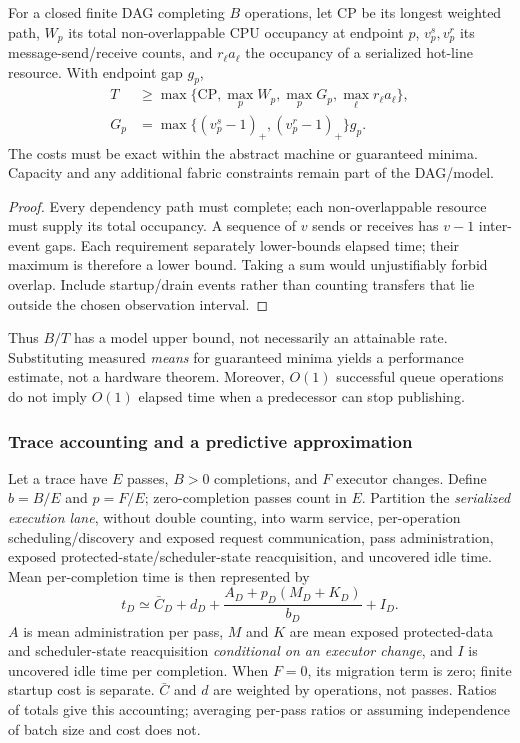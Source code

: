\begin{proposition}
\label{prop:resource}
For a closed finite DAG completing $B$ operations, let $\mathrm{CP}$ be its
longest weighted path, $W_p$ its total non-overlappable CPU occupancy at
endpoint $p$, $v_p^s,v_p^r$ its message-send/receive counts, and $r_\ell a_\ell$
the occupancy of a serialized hot-line resource. With endpoint gap $g_p$,
\begin{align}
T &\ge \max\{\mathrm{CP},\max_p W_p,\max_p G_p,
                    \max_\ell r_\ell a_\ell\},\label{eq:resource}\\
G_p&=\max\{(v_p^s-1)_+,(v_p^r-1)_+\}g_p .\nonumber
\end{align}
The costs must be exact within the abstract machine or guaranteed minima.
Capacity and any additional fabric constraints remain part of the DAG/model.
\end{proposition}
\begin{proof}
Every dependency path must complete; each non-overlappable resource must
supply its total occupancy. A sequence of $v$ sends or receives has $v-1$
inter-event gaps. Each requirement separately lower-bounds elapsed time;
their maximum is therefore a lower bound. Taking a sum would unjustifiably
forbid overlap. Include startup/drain events rather than counting transfers
that lie outside the chosen observation interval.
\end{proof}
Thus $B/T$ has a model upper bound, not necessarily an attainable rate.
Substituting measured \emph{means} for guaranteed minima yields a performance
estimate, not a hardware theorem. Moreover, $O(1)$ successful queue operations
do not imply $O(1)$ elapsed time when a predecessor can stop publishing.

\subsubsection{Trace accounting and a predictive approximation}
Let a trace have $E$ passes, $B>0$ completions, and $F$ executor changes.
Define $b=B/E$ and $p=F/E$; zero-completion passes count in $E$.
Partition the \emph{serialized execution lane}, without double counting,
into warm service, per-operation scheduling/discovery and exposed request
communication, pass administration, exposed protected-state/scheduler-state
reacquisition, and uncovered idle time. Mean per-completion time is then
represented by
\begin{equation}
 t_D \simeq \bar C_D+d_D+
 \frac{A_D+p_D(M_D+K_D)}{b_D}+I_D .\label{eq:delegation}
\end{equation}
$A$ is mean administration per pass, $M$ and $K$ are mean exposed protected-data
and scheduler-state reacquisition \emph{conditional on an executor change},
and $I$ is uncovered idle time per completion. When $F=0$, its migration term
is zero; finite startup cost is separate. $\bar C$ and $d$ are weighted by
operations, not passes. Ratios of totals give this accounting; averaging
per-pass ratios or assuming independence of batch size and cost does not.

